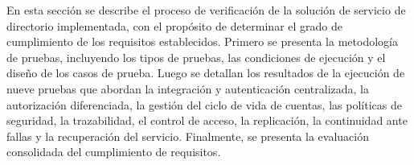 \label{cap:pruebas}
\vspace*{0.7cm}

En esta sección se describe el proceso de verificación de la solución de servicio de directorio implementada, con el propósito de determinar el grado de cumplimiento de los requisitos establecidos. Primero se presenta la metodología de pruebas, incluyendo los tipos de pruebas, las condiciones de ejecución y el diseño de los casos de prueba. Luego se detallan los resultados de la ejecución de nueve pruebas que abordan la integración y autenticación centralizada, la autorización diferenciada, la gestión del ciclo de vida de cuentas, las políticas de seguridad, la trazabilidad, el control de acceso, la replicación, la continuidad ante fallas y la recuperación del servicio. Finalmente, se presenta la evaluación consolidada del cumplimiento de requisitos.





